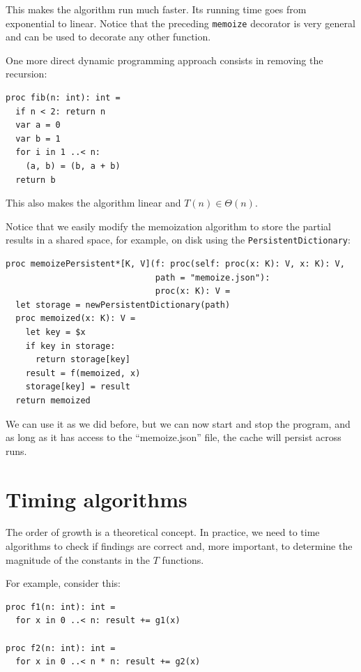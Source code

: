 \documentclass[justified, sixbynine]{tufte-book}
\def\ft{\small\tt}
\theoremstyle{plain}%
\newtheorem * {corollary}{Corollary}
\theoremstyle{definition}
\theoremstyle{remark}
\newtheorem * {remark}{Remark}
\newtheorem * {note}{Note}
\begin{document}
\begin{fullwidth}
This makes the algorithm run much faster. Its running time goes from exponential to linear. Notice that the preceding {\ft memoize} decorator is very general and can be used to decorate any other function.

One more direct
dynamic programming approach consists in removing the recursion:

\begin{lstlisting}
proc fib(n: int): int =
  if n < 2: return n
  var a = 0
  var b = 1
  for i in 1 ..< n:
    (a, b) = (b, a + b)
  return b
\end{lstlisting}

This also makes the algorithm linear and $T(n) \in \Theta(n)$.


Notice that we easily modify the memoization algorithm to store the partial results in a shared space, for example, on disk using the {\ft PersistentDictionary}:

\begin{lstlisting}[caption={in file: {\ft nlib/memoize.nim}}]
proc memoizePersistent*[K, V](f: proc(self: proc(x: K): V, x: K): V,
                              path = "memoize.json"):
                              proc(x: K): V =
  let storage = newPersistentDictionary(path)
  proc memoized(x: K): V =
    let key = $x
    if key in storage:
      return storage[key]
    result = f(memoized, x)
    storage[key] = result
  return memoized
\end{lstlisting}

We can use it as we did before, but we can now start and stop the program, and as long as it has access to the ``memoize.json'' file, the cache will persist across runs.


\goodbreak\section{Timing algorithms}

The order of growth is a theoretical concept. In practice, we need to time algorithms to check if findings are correct and, more important, to determine the magnitude of the constants in the $T$ functions.

For example, consider this:
\begin{lstlisting}
proc f1(n: int): int =
  for x in 0 ..< n: result += g1(x)

proc f2(n: int): int =
  for x in 0 ..< n * n: result += g2(x)
\end{lstlisting}



\end{fullwidth}
\end{document}
